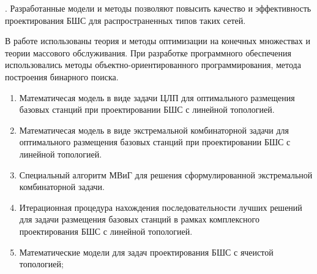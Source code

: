 {\influence}. Разработанные модели и методы позволяют повысить качество и эффективность проектирования БШС для распространенных типов таких сетей.


{\methods} В работе использованы теория и методы оптимизации на конечных множествах и теории массового обслуживания. При разработке программного обеспечения использовались методы объектно-ориентированного программирования, метода построения бинарного поиска.

{}

\begin{enumerate}[beginpenalty=10000] %
    \item Математичесая модель в виде задачи ЦЛП для оптимального размещения базовых станций при проектировании БШС с линейной топологией.
    \item Математичесая модель в виде экстремальной комбинаторной задачи для оптимального размещения базовых станций при проектировании БШС с линейной топологией.
    \item Специальный алгоритм МВиГ для решения сформулированной
    экстремальной комбинаторной задачи.
    \item Итерационная процедура нахождения последовательности лучших
    решений для задачи размещения базовых станций в рамках комплексного
    проектирования БШС с линейной топологией.
    \item Математические модели для задач проектирования БШС с ячеистой
    топологией;
  \end{enumerate}

